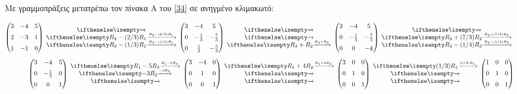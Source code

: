 \documentclass[12pt, fleqn, leqno]{extreport}
\begin{document}
Με γραμμοπράξεις μετατρέπω τον πίνακα A του \eqref{34} σε ανηγμένο κλιμακωτό:

\begin{equation*}
    \begin{aligned}
        \begin{pmatrix}
            3 & -4 & 5 \\[0.2cm]
            2 & -3 & 1 \\[0.2cm]
            1 & -1 & 0
        \end{pmatrix}\rowops{,R_{2}-(2/3)R_{1},R_{3}-(1/3)R_{1}}
        \begin{pmatrix}
            3 & -4           & 5            \\[0.2cm]
            0 & -\frac{1}{3} & -\frac{7}{3} \\[0.2cm]
            0 & \frac{1}{3}  & -\frac{5}{3}
        \end{pmatrix}\rowops{,,R_{3}+R_{2}}
        \begin{pmatrix}
            3 & -4           & 5            \\[0.2cm]
            0 & -\frac{1}{3} & -\frac{7}{3} \\[0.2cm]
            0 & 0            & -4
        \end{pmatrix}\rowops{,R_{2}+(7/3)R_{2},R_{3}-(1/4)R_{3}} \\[0.2cm]
        \begin{pmatrix}
            3 & -4           & 5 \\[0.2cm]
            0 & -\frac{1}{3} & 0 \\[0.2cm]
            0 & 0            & 1
        \end{pmatrix}\rowops{R_{1}-5R_{3},-3R_{2},}
        \begin{pmatrix}
            3 & -4 & 0 \\[0.2cm]
            0 & 1  & 0 \\[0.2cm]
            0 & 0  & 1
        \end{pmatrix}
        \rowops{R_{1}+4R_{2},,}
        \begin{pmatrix}
            3 & 0 & 0 \\[0.2cm]
            0 & 1 & 0 \\[0.2cm]
            0 & 0 & 1
        \end{pmatrix}
        \rowops{(1/3)R_{1},,}
        \begin{pmatrix}
            1 & 0 & 0 \\[0.2cm]
            0 & 1 & 0 \\[0.2cm]
            0 & 0 & 1
        \end{pmatrix}
    \end{aligned}
\end{equation*}
\end{document}
